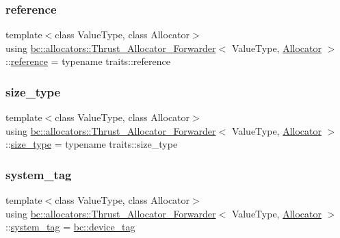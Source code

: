 \subsubsection{\texorpdfstring{reference}{reference}}
{\footnotesize\ttfamily template$<$class Value\+Type, class Allocator$>$ \\
using \hyperlink{structbc_1_1allocators_1_1Thrust__Allocator__Forwarder}{bc\+::allocators\+::\+Thrust\+\_\+\+Allocator\+\_\+\+Forwarder}$<$ Value\+Type, \hyperlink{classbc_1_1allocators_1_1Allocator}{Allocator} $>$\+::\hyperlink{structbc_1_1allocators_1_1Thrust__Allocator__Forwarder_abc8c9530854de1017446433e27ef8ae1}{reference} =  typename traits\+::reference}

\mbox{\label{structbc_1_1allocators_1_1Thrust__Allocator__Forwarder_a0d59ede93a4c3e6530494375e1e6821e}} 
\subsubsection{\texorpdfstring{size\+\_\+type}{size\_type}}
{\footnotesize\ttfamily template$<$class Value\+Type, class Allocator$>$ \\
using \hyperlink{structbc_1_1allocators_1_1Thrust__Allocator__Forwarder}{bc\+::allocators\+::\+Thrust\+\_\+\+Allocator\+\_\+\+Forwarder}$<$ Value\+Type, \hyperlink{classbc_1_1allocators_1_1Allocator}{Allocator} $>$\+::\hyperlink{structbc_1_1allocators_1_1Thrust__Allocator__Forwarder_a0d59ede93a4c3e6530494375e1e6821e}{size\+\_\+type} =  typename traits\+::size\+\_\+type}

\mbox{\label{structbc_1_1allocators_1_1Thrust__Allocator__Forwarder_a3f0fd576911b835e873f20b587a6f801}} 
\subsubsection{\texorpdfstring{system\+\_\+tag}{system\_tag}}
{\footnotesize\ttfamily template$<$class Value\+Type, class Allocator$>$ \\
using \hyperlink{structbc_1_1allocators_1_1Thrust__Allocator__Forwarder}{bc\+::allocators\+::\+Thrust\+\_\+\+Allocator\+\_\+\+Forwarder}$<$ Value\+Type, \hyperlink{classbc_1_1allocators_1_1Allocator}{Allocator} $>$\+::\hyperlink{structbc_1_1allocators_1_1Thrust__Allocator__Forwarder_a3f0fd576911b835e873f20b587a6f801}{system\+\_\+tag} =  \hyperlink{structbc_1_1device__tag}{bc\+::device\+\_\+tag}}

